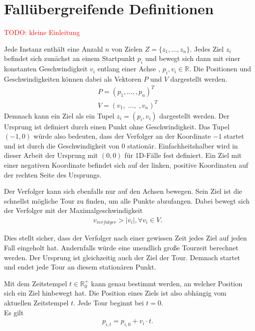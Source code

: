 \documentclass[german,version-2019-11]{uzl-thesis}
\begin{document}
\section{Fallübergreifende Definitionen}
\textcolor{red}{TODO: kleine Einleitung}
\begin{definition} 
\label{def:Ziel}
Jede Instanz enthält eine Anzahl $n$ von Zielen $Z = \{z_1,...,z_n\}$. Jedes Ziel $z_i$ befindet sich zunächst an einem Startpunkt $p_i$ und bewegt sich dann mit einer konstanten Geschwindigkeit $v_i$ entlang einer Achse , $p_i, v_i \in\mathbb{R}$. Die Positionen und Geschwindigkeiten können dabei als Vektoren $P$ und $V$ dargestellt werden.
\begin{align*}
P = (p_1, ..., ,p_n)^T \\
V = (v_1, \; ..., \; ,v_n)^T
\end{align*}
Demnach kann ein Ziel als ein Tupel $z_i = (p_i, v_i)$ dargestellt werden. Der Ursprung ist definiert durch einen Punkt ohne Geschwindigkeit. Das Tupel $(-1,0)$ würde also bedeuten, dass der Verfolger an der Koordinate $-1$ startet und ist durch die Geschwindigkeit von $0$ stationär. Einfachheitshalber wird in dieser Arbeit der Ursprung mit $(0,0)$ für 1D-Fälle fest definiert. Ein Ziel mit einer negativen Koordinate befindet sich auf der linken, positive Koordinaten auf der rechten Seite des Ursprungs. 
\end{definition}

\begin{definition}
Der Verfolger kann sich ebenfalls nur auf den Achsen bewegen. Sein Ziel ist die schnellst mögliche Tour zu finden, um alle Punkte abzufangen. Dabei bewegt sich der Verfolger mit der Maximalgeschwindigkeit 
\begin{align*}
v_{verfolger} > |v_i|, \forall v_i\in V.
\end{align*}

Dies stellt sicher, dass der Verfolger nach einer gewissen Zeit jedes Ziel auf jeden Fall eingeholt hat. Andernfalls würde eine unendlich große Tourzeit berechnet werden. Der Ursprung ist gleichzeitig auch der Ziel der Tour. Demnach startet und endet jede Tour an diesem stationären Punkt.
\end{definition}

\begin{definition}
\label{def:UpdatedPos}
Mit dem Zeitstempel $t\in \mathbb{R}^+_0$ kann genau bestimmt werden, an welcher Position sich ein Ziel hinbewegt hat. Die Position eines Ziels ist also abhängig vom aktuellen Zeitstempel $t$. Jede Tour beginnt bei $t=0$. \\
Es gilt
\begin{align*}
p_{i,t} = p_{i,0} + v_i\cdot t.
\end{align*} 
\end{definition}
\end{document}
